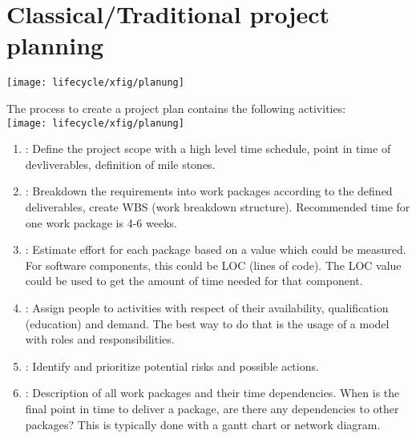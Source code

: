 \section{Classical/Traditional project planning}
\ifslides
\begin{center}
\texttt{[image: lifecycle/xfig/planung]}
\end{center}
\else
The process to create a project plan contains the following
activities:\\[3ex]
\texttt{[image: lifecycle/xfig/planung]}\\[2ex]
\fi
\begin{enumerate}
\item {}:
  Define the project scope with a high level time schedule,
  point in time of devliverables, definition of mile stones.
\item {}:
  Breakdown the requirements into work packages according to the defined
  deliverables, create WBS (work breakdown structure). Recommended time
  for one work package is 4-6 weeks.
\item {}:
  Estimate effort for each package based on a value which could be measured.
  For software components, this could be LOC (lines of code). The LOC value
  could be used to get the amount of time needed for that component.
\newslide
\item {}:
  Assign people to activities with respect of their
  availability, qualification (education) and demand.
  The best way to do that is the usage of a model with
  roles and responsibilities.
\item {}:
  Identify and prioritize potential risks and possible actions.
\item {}:
  Description of all work packages and their time dependencies.
  When is the final point in time to deliver a package, are there any
  dependencies to other packages? This is typically done with a
  gantt chart or network diagram.
\end{enumerate}
